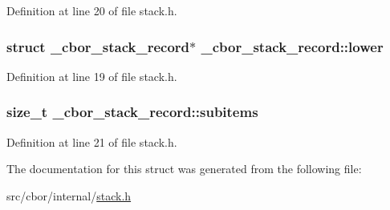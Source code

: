 Definition at line 20 of file stack.\-h.

\hypertarget{struct__cbor__stack__record_aca7db1e610ee0983b0e24e081ee3e5dd}{
\subsubsection[{lower}]{\setlength{\rightskip}{0pt plus 5cm}struct {\bf \-\_\-cbor\-\_\-stack\-\_\-record}$\ast$ \-\_\-cbor\-\_\-stack\-\_\-record\-::lower}}\label{struct__cbor__stack__record_aca7db1e610ee0983b0e24e081ee3e5dd}


Definition at line 19 of file stack.\-h.

\hypertarget{struct__cbor__stack__record_a9b69c0ea00da449b080343a97c026cef}{
\subsubsection[{subitems}]{\setlength{\rightskip}{0pt plus 5cm}size\-\_\-t \-\_\-cbor\-\_\-stack\-\_\-record\-::subitems}}\label{struct__cbor__stack__record_a9b69c0ea00da449b080343a97c026cef}


Definition at line 21 of file stack.\-h.



The documentation for this struct was generated from the following file\-:\begin{DoxyCompactItemize}
\item 
src/cbor/internal/\hyperlink{stack_8h}{stack.\-h}\end{DoxyCompactItemize}
